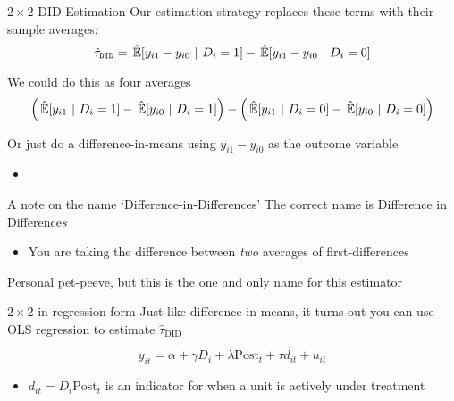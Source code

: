 \documentclass[aspectratio=169,t,11pt,table]{beamer}
\begin{document}
\begin{frame}{$2 \times 2$ DID Estimation}
  Our estimation strategy replaces these terms with their sample averages:
  $$
    \hat{\tau}_{\texttt{DID}} = \expechat{y_{i1} - y_{i0}}{D_i = 1} - \expechat{y_{i1} - y_{i0}}{D_i = 0}
  $$

  \bigskip
  We could do this as four averages
  $$
    \left(\expechat{y_{i1}}{D_i = 1} - \expechat{y_{i0}}{D_i = 1}\right) - \left(\expechat{y_{i1}}{D_i = 0} - \expechat{y_{i0}}{D_i = 0} \right)
  $$

  \pause
  \bigskip
  Or just do a difference-in-means using $y_{i1} - y_{i0}$ as the outcome variable
  \begin{itemize}
    \item {}
  \end{itemize}
\end{frame}

\begin{frame}{A note on the name `Difference-in-Differences'}
  The correct name is Difference in Difference\emph{s}
  \begin{itemize}
    \item You are taking the difference between \emph{two} averages of first-differences
  \end{itemize}

  \bigskip
  Personal pet-peeve, but this is the one and only name for this estimator
\end{frame}

\begin{frame}{$2 \times 2$ in regression form}
  Just like difference-in-means, it turns out you can use OLS regression to estimate $\hat{\tau}_{\text{DID}}$

  $$
    y_{it} = \alpha + \gamma D_i + \lambda \text{Post}_t + \tau d_{it} + u_{it}
  $$
  \begin{itemize}
    \item $d_{it} = D_i \text{Post}_t$ is an indicator for when a unit is actively under treatment
  \end{itemize}

\end{frame}
\end{document}
